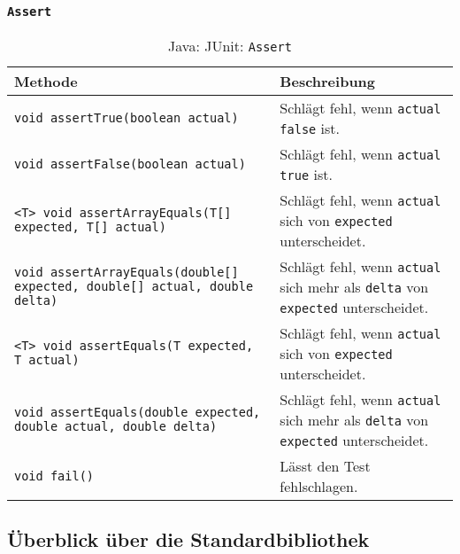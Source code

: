 		\subsubsection{\texttt{Assert}}
			\begin{sidewaystable}
				\centering
				\begin{tabular}{l | p{8cm}}
					Methode                                                                           & Beschreibung                                                                                         \\
					\hline
					\texttt{void assertTrue(boolean actual)}                                          & Schlägt fehl, wenn \texttt{actual} \texttt{false} ist.                                               \\
					\texttt{void assertFalse(boolean actual)}                                         & Schlägt fehl, wenn \texttt{actual} \texttt{true} ist.                                                \\
					\texttt{<T> void assertArrayEquals(T[] expected, T[] actual)}                     & Schlägt fehl, wenn \texttt{actual} sich von \texttt{expected} unterscheidet.                         \\
					\texttt{void assertArrayEquals(double[] expected, double[] actual, double delta)} & Schlägt fehl, wenn \texttt{actual} sich mehr als \texttt{delta} von \texttt{expected} unterscheidet. \\
					\texttt{<T> void assertEquals(T expected, T actual)}                              & Schlägt fehl, wenn \texttt{actual} sich von \texttt{expected} unterscheidet.                         \\
					\texttt{void assertEquals(double expected, double actual, double delta)}          & Schlägt fehl, wenn \texttt{actual} sich mehr als \texttt{delta} von \texttt{expected} unterscheidet. \\
					\texttt{void fail()}                                                              & Lässt den Test fehlschlagen.                                                                         \\
				\end{tabular}
				\caption{Java: JUnit: \texttt{Assert}}
			\end{sidewaystable}




	\subsection{Überblick über die Standardbibliothek}
